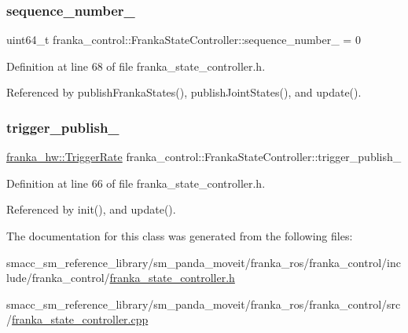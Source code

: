\subsubsection{\texorpdfstring{sequence\+\_\+number\+\_\+}{sequence\_number\_}}
{\footnotesize\ttfamily uint64\+\_\+t franka\+\_\+control\+::\+Franka\+State\+Controller\+::sequence\+\_\+number\+\_\+ = 0\hspace{0.3cm}{\ttfamily [private]}}



Definition at line 68 of file franka\+\_\+state\+\_\+controller.\+h.



Referenced by publish\+Franka\+States(), publish\+Joint\+States(), and update().

\mbox{\label{classfranka__control_1_1FrankaStateController_a1c903d6812d02a29796d64b0fc3eb51d}} 
\subsubsection{\texorpdfstring{trigger\+\_\+publish\+\_\+}{trigger\_publish\_}}
{\footnotesize\ttfamily \hyperlink{classfranka__hw_1_1TriggerRate}{franka\+\_\+hw\+::\+Trigger\+Rate} franka\+\_\+control\+::\+Franka\+State\+Controller\+::trigger\+\_\+publish\+\_\+\hspace{0.3cm}{\ttfamily [private]}}



Definition at line 66 of file franka\+\_\+state\+\_\+controller.\+h.



Referenced by init(), and update().



The documentation for this class was generated from the following files\+:\begin{DoxyCompactItemize}
\item 
smacc\+\_\+sm\+\_\+reference\+\_\+library/sm\+\_\+panda\+\_\+moveit/franka\+\_\+ros/franka\+\_\+control/include/franka\+\_\+control/\hyperlink{franka__state__controller_8h}{franka\+\_\+state\+\_\+controller.\+h}\item 
smacc\+\_\+sm\+\_\+reference\+\_\+library/sm\+\_\+panda\+\_\+moveit/franka\+\_\+ros/franka\+\_\+control/src/\hyperlink{franka__state__controller_8cpp}{franka\+\_\+state\+\_\+controller.\+cpp}\end{DoxyCompactItemize}
